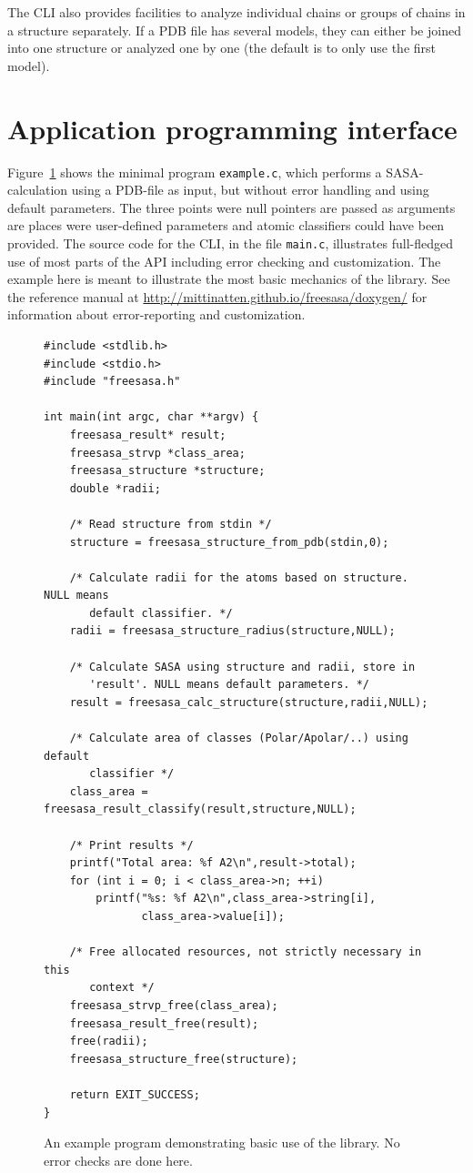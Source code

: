 \documentclass[a4paper,11pt]{article}
\begin{document}
The CLI also provides facilities to analyze individual chains or
groups of chains in a structure separately. If a PDB file has several
models, they can either be joined into one structure or analyzed one
by one (the default is to only use the first model).

\section{Application programming interface}\label{sec:api}

Figure~\ref{fig:example_c} shows the minimal program \verb|example.c|,
which performs a SASA-calculation using a PDB-file as input, but
without error handling and using default parameters. The three points
were null pointers are passed as arguments are places were
user-defined parameters and atomic classifiers could have been
provided. The source code for the CLI, in the file \verb|main.c|,
illustrates full-fledged use of most parts of the API including error
checking and customization. The example here is meant to illustrate
the most basic mechanics of the library. See the reference manual at
\url{http://mittinatten.github.io/freesasa/doxygen/} for information
about error-reporting and customization.

\begin{figure}
  \begin{small}
  \begin{verbatim}
#include <stdlib.h>
#include <stdio.h>
#include "freesasa.h"

int main(int argc, char **argv) {
    freesasa_result* result;
    freesasa_strvp *class_area;
    freesasa_structure *structure;
    double *radii;

    /* Read structure from stdin */
    structure = freesasa_structure_from_pdb(stdin,0);

    /* Calculate radii for the atoms based on structure.  NULL means
       default classifier. */
    radii = freesasa_structure_radius(structure,NULL);

    /* Calculate SASA using structure and radii, store in
       'result'. NULL means default parameters. */
    result = freesasa_calc_structure(structure,radii,NULL);
    
    /* Calculate area of classes (Polar/Apolar/..) using default
       classifier */
    class_area = freesasa_result_classify(result,structure,NULL);

    /* Print results */
    printf("Total area: %f A2\n",result->total);
    for (int i = 0; i < class_area->n; ++i)
        printf("%s: %f A2\n",class_area->string[i],
               class_area->value[i]);

    /* Free allocated resources, not strictly necessary in this
       context */
    freesasa_strvp_free(class_area);
    freesasa_result_free(result);
    free(radii);
    freesasa_structure_free(structure);

    return EXIT_SUCCESS;
}
  \end{verbatim}
  \end{small}
  \caption{An example program demonstrating basic use of the
    library. No error checks are done here. \label{fig:example_c}}
\end{figure}
\end{document}
